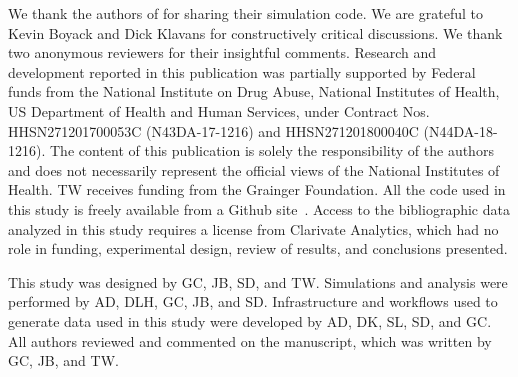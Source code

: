 \documentclass[NETN]{stjour}
\begin{document}
\acknowledgments
 We thank the authors of \cite{uzzi_atypical_2013} for sharing their simulation code. We are grateful to Kevin Boyack and Dick Klavans for constructively critical discussions. We thank two anonymous reviewers for their insightful comments. Research and development reported in this publication was partially supported by Federal funds from the National Institute on Drug Abuse, National Institutes of Health, US Department of Health and Human Services, under Contract Nos. HHSN271201700053C (N43DA-17-1216) and HHSN271201800040C (N44DA-18-1216). The content of this publication is solely the responsibility of the authors and does not necessarily represent the official views of the National Institutes of Health. TW receives funding from the Grainger Foundation. All the code used in this study is freely available from a Github site~\citep{GithubERNIE2019}. Access to the bibliographic data analyzed in this study requires a license from Clarivate Analytics, which had no role in funding, experimental design, review of results, and conclusions presented. 

\authorcontributions 
This study was designed by GC, JB, SD, and TW. Simulations and analysis were performed by AD, DLH, GC, JB, and SD. Infrastructure and workflows used to generate data used in this study were developed by AD, DK, SL, SD, and GC.  All authors reviewed and commented on the manuscript, which was written by GC, JB, and TW.


\end{document}
